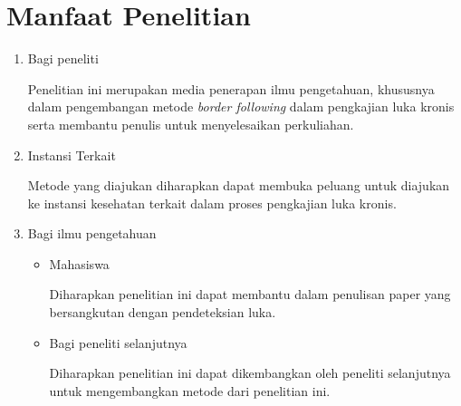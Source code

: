\section{Manfaat Penelitian}
\begin{enumerate}
	\item Bagi peneliti
		
	Penelitian ini merupakan media penerapan ilmu 
	pengetahuan, khususnya dalam pengembangan metode \textit{border following} 
	dalam pengkajian luka kronis serta membantu 
	penulis untuk menyelesaikan perkuliahan.
		
	\item Instansi Terkait
	 	
	Metode yang diajukan diharapkan dapat membuka peluang 
	untuk diajukan ke instansi kesehatan terkait dalam 
	proses pengkajian luka kronis.
	
	\item Bagi ilmu pengetahuan
	 	
	\begin{itemize}
		\item Mahasiswa
		
		Diharapkan penelitian ini dapat membantu dalam 
		penulisan paper yang bersangkutan dengan 
		pendeteksian luka.

		\item Bagi peneliti selanjutnya
		
		Diharapkan penelitian ini dapat dikembangkan oleh 
		peneliti selanjutnya untuk mengembangkan metode dari 
		penelitian ini.
	\end{itemize} 			
\end{enumerate}


\begin{comment}

\end{comment}
